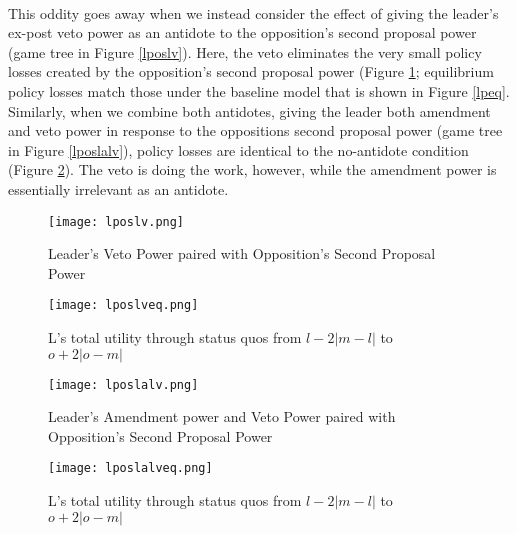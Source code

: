 \documentclass[12pt]{article}
\theoremstyle{plain}		      \newtheorem{assn}{Assumption}
\theoremstyle{plain}		      \newtheorem{prop}{Proposition}
\theoremstyle{plain}		      \newtheorem{lemma}{Lemma}
\theoremstyle{plain}	          \newtheorem{imp}{Implication}
\theoremstyle{plain}	          \newtheorem{hyp}{Hypothesis}
\theoremstyle{definition}		  \newtheorem{defn}{Definition}
\theoremstyle{remark}	          \newtheorem{rem}{Remark}
\theoremstyle{definition}         \newtheorem{case}{Case}
\begin{document}
\\
\indent This oddity goes away when we instead consider the effect of giving the leader's ex-post veto power as an antidote to the opposition's second proposal power (game tree in Figure \ref{lposlv}). Here, the veto eliminates the very small policy losses created by the opposition's second proposal power (Figure \ref{lposlveq}; equilibrium policy losses match those under the baseline model that is shown in Figure \ref{lpeq}. Similarly, when we combine both antidotes, giving the leader both amendment and veto power in response to the oppositions second proposal power (game tree in Figure \ref{lposlalv}), policy losses are identical to the no-antidote condition (Figure \ref{lposlalveq}). The veto is doing the work, however, while the amendment power is essentially irrelevant as an antidote.

\begin{figure}[h]
  \centering
  \begin{minipage}[b]{0.3\textwidth}
    \texttt{[image: lposlv.png]}
    \caption{Leader's Veto Power paired with Opposition's Second Proposal Power}
    \label{lposlv}
  \end{minipage}
  \hfill
  \begin{minipage}[b]{0.6\textwidth}
    \texttt{[image: lposlveq.png]}
    \caption{L's total utility through status quos \newline from $l-2|m-l|$ to $o+2|o-m|$}
    \label{lposlveq}
  \end{minipage}
\end{figure}
\FloatBarrier

\begin{figure}[h]
  \centering
  \begin{minipage}[b]{0.3\textwidth}
    \texttt{[image: lposlalv.png]}
    \caption{Leader's Amendment power and Veto Power paired with Opposition's Second Proposal Power}
    \label{lposlalv}
  \end{minipage}
  \hfill
  \begin{minipage}[b]{0.6\textwidth}
    \texttt{[image: lposlalveq.png]}
    \caption{L's total utility through status quos \newline from $l-2|m-l|$ to $o+2|o-m|$}
    \label{lposlalveq}
  \end{minipage}
\end{figure}
\FloatBarrier
\end{document}
